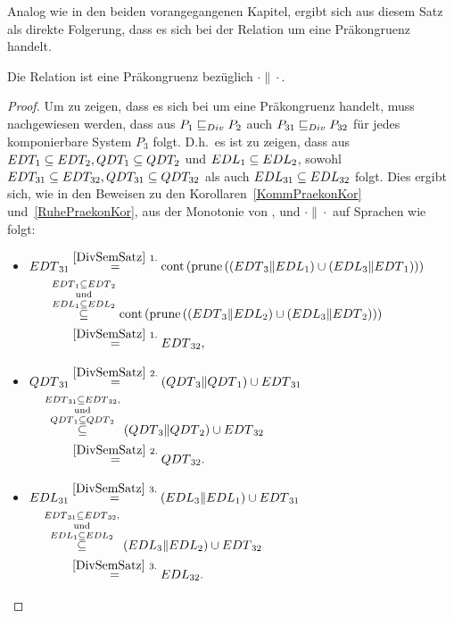 Analog wie in den beiden vorangegangenen Kapitel, ergibt sich aus diesem Satz
als direkte Folgerung, dass es sich bei der Relation \DRel{} um eine
Präkongruenz handelt.

\begin{Kor}
  Die Relation \DRel{} ist eine Präkongruenz bezüglich $\cdot\|\cdot$.
\end{Kor}
\begin{proof}
  Um zu zeigen, dass es sich bei \DRel{} um eine Präkongruenz handelt, muss
  nachgewiesen werden, dass aus $P_1 \sqsubseteq  _{Div} P_2$ auch $P_{31} \sqsubseteq  _{Div} P_{32}$ für
  jedes komponierbare System $P_3$ folgt. D.h.\ es ist zu zeigen, dass aus
  $EDT _1\subseteq EDT _2, QDT _1\subseteq QDT _2$ und $EDL _1\subseteq EDL
  _2$, sowohl $EDT _{31} \subseteq EDT _{32}, QDT _{31} \subseteq QDT
  _{32}$ als auch $EDL _{31}\subseteq EDL _{32}$ folgt. Dies ergibt sich, wie
  in den Beweisen zu den Korollaren~\ref{KommPraekonKor}
  und~\ref{RuhePraekonKor}, aus der Monotonie von \cont{}, \prune{} und
  $\cdot\|\cdot$ auf Sprachen wie folgt:
  \begin{itemize}
    \item $\begin{aligned}[t]
        \EDT{}_{31} &\overset{\ref{DivSemSatz}~1.}{=}
        \cont{}\left(\prune{}\left(\left(\EDT{}_3\|\EDL{}_1\right) \cup
        \left(\EDL{}_3\|\EDT{}_1\right)\right)\right)\\
        &\hspace{-0.6cm}\overset{\EDT{}_1\subseteq
      \EDT{}_2}{\overset{\mathrm{und}}{\overset{\EDL{}_1\subseteq
    \EDL{}_2}{\subseteq}}}
    \cont{}\left(\prune{}\left(\left(\EDT{}_3\|\EDL{}_2\right) \cup
        \left(\EDL{}_3\|\EDT{}_2\right)\right)\right)\\
      &\overset{\ref{DivSemSatz}~1.}{=} \EDT{}_{32},
    \end{aligned}$
    \item $\begin{aligned}[t]
        \QDT{}_{31} &\overset{\ref{DivSemSatz}~2.}{=} (\QDT{}_3\|\QDT{}_1)
        \cup \EDT{}_{31}\\
        &\hspace{-0.8cm}\overset{\EDT{}_{31}\subseteq
      \EDT{}_{32},}{\overset{\mathrm{und}}{\overset{\QDT{}_1\subseteq
      \QDT{}_2}{\subseteq}}} (\QDT{}_3\|\QDT{}_2) \cup \EDT{}_{32}\\
      &\overset{\ref{DivSemSatz}~2.}{=} \QDT{}_{32}.
    \end{aligned}$
    \item $\begin{aligned}[t]
        \EDL{}_{31} &\overset{\ref{DivSemSatz}~3.}{=} (\EDL{}_3\|\EDL{}_1)
        \cup \EDT{}_{31}\\
        &\hspace{-0.8cm}\overset{\EDT{}_{31}\subseteq
      \EDT{}_{32},}{\overset{\mathrm{und}}{\overset{\EDL{}_1\subseteq
      \EDL{}_2}{\subseteq}}} (\EDL{}_3\|\EDL{}_2) \cup \EDT{}_{32}\\
      &\overset{\ref{DivSemSatz}~3.}{=} \EDL{}_{32}.
    \end{aligned}$
  \end{itemize}
\end{proof}

